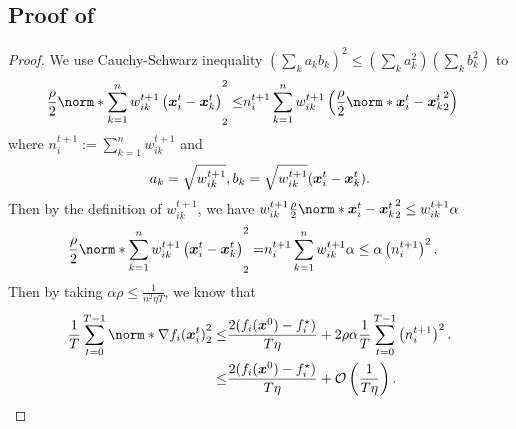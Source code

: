 \documentclass{article}
\begin{document}
\subsection{Proof of }\label{ssec:proof:convergence:1}
\begin{proof}
  We use Cauchy-Schwarz inequality $(\sum_k a_k b_k)^2\le (\sum_k a_k^2)(\sum_k b_k^2)$ to 
  \begin{align*}
   \frac{\rho}{2}\norm*{\sum_{k=1}^n w^{t+1}_{ik} \left(\xx^t_i - \xx^t_k\right) }_2^2
   \le& n_i^{t+1} \sum_{k=1}^n w^{t+1}_{ik} \left(\frac{\rho}{2} \norm*{\xx^t_i - \xx^t_k}_2^2 \right)
  \end{align*}
  where $n_i^{t+1}:=\sum_{k=1}^n w_{ik}^{t+1}$ and
  \begin{align*}
   a_k=\sqrt{w_{ik}^{t+1}},b_k=\sqrt{w_{ik}^{t+1}}(\bm{x}_i^t-\bm{x}_k^t).
  \end{align*}
  Then by the definition of $w_{ik}^{t+1}$, we have $w_{ik}^{t+1}\frac{\rho}{2} \norm*{\xx^t_i - \xx^t_k}_2^2 \le w_{ik}^{t+1} \alpha$
   \begin{align*}
     \frac{\rho}{2}\norm*{\sum_{k=1}^n w^{t+1}_{ik} \left(\xx^t_i - \xx^t_k\right) }_2^2
     =& n_i^{t+1} \sum_{k=1}^n w^{t+1}_{ik} \alpha
     \le \alpha\left(n_i^{t+1}\right)^2.
   \end{align*}
     Then by taking $\alpha\rho\le\frac{1}{n^2\eta T}$, we know that
   \begin{align*}
     \frac{1}{T}\sum_{t=0}^{T-1} \norm*{\nabla f_i(\xx_i^t)}_2^2
     \le& \frac{2(f_i(\xx^{0}) - f_i^\star)}{T\eta}
     + 2\rho\alpha\frac{1}{T}\sum_{t=0}^{T-1}\left(n_i^{t+1}\right)^2. \\
     \le& \frac{2(f_i(\xx^{0}) - f_i^\star)}{T\eta} + \cO\left(\frac{1}{T\eta}\right).
   \end{align*}
 \end{proof}
\end{document}
